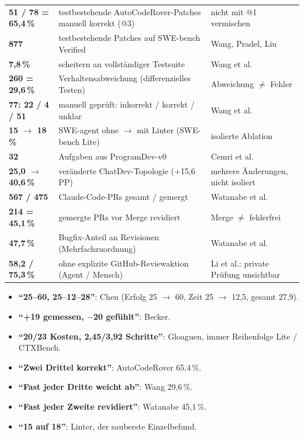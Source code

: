 \documentclass[12pt,a4paper]{article}
\newcommand{\pp}{\,PP}
\begin{document}
\begin{longtable}{@{}>{\bfseries}p{2.7cm}p{7.6cm}p{5.6cm}@{}}
51 / 78 = 65,4\,\% & testbestehende AutoCodeRover-Patches manuell korrekt (@3) & nicht mit @1 vermischen \\
877 & testbestehende Patches auf SWE-bench Verified & Wang, Pradel, Liu \\
7,8\,\% & scheitern an vollständiger Testsuite & Wang et al. \\
260 = 29,6\,\% & Verhaltensabweichung (differenzielles Testen) & Abweichung $\neq$ Fehler \\
77: 22 / 4 / 51 & manuell geprüft: inkorrekt / korrekt / unklar & Wang et al. \\
15 $\to$ 18\,\% & SWE-agent ohne $\to$ mit Linter (SWE-bench Lite) & isolierte Ablation \\
32 & Aufgaben aus ProgramDev-v0 & Cemri et al. \\
25,0 $\to$ 40,6\,\% & veränderte ChatDev-Topologie (+15,6\pp) & mehrere Änderungen, nicht isoliert \\
567 / 475 & Claude-Code-PRs gesamt / gemergt & Watanabe et al. \\
214 = 45,1\,\% & gemergte PRs vor Merge revidiert & Merge $\neq$ fehlerfrei \\
47,7\,\% & Bugfix-Anteil an Revisionen (Mehrfachzuordnung) & Watanabe et al. \\
58,2 / 75,3\,\% & ohne explizite GitHub-Reviewaktion (Agent / Mensch) & Li et al.: private Prüfung unsichtbar \\
\bottomrule
\end{longtable}

\begin{tipp}[Eselsbrücken]
\begin{itemize}
  \item \textbf{\enquote{25--60, 25--12--28}}: Chen (Erfolg 25 $\to$ 60, Zeit 25 $\to$ 12,5, gesamt 27,9).
  \item \textbf{\enquote{+19 gemessen, $-$20 gefühlt}}: Becker.
  \item \textbf{\enquote{20/23 Kosten, 2,45/3,92 Schritte}}: Gloaguen, immer Reihenfolge Lite / CTXBench.
  \item \textbf{\enquote{Zwei Drittel korrekt}}: AutoCodeRover 65,4\,\%.
  \item \textbf{\enquote{Fast jeder Dritte weicht ab}}: Wang 29,6\,\%.
  \item \textbf{\enquote{Fast jeder Zweite revidiert}}: Watanabe 45,1\,\%.
  \item \textbf{\enquote{15 auf 18}}: Linter, der sauberste Einzelbefund.
\end{itemize}
\end{tipp}
\end{document}
